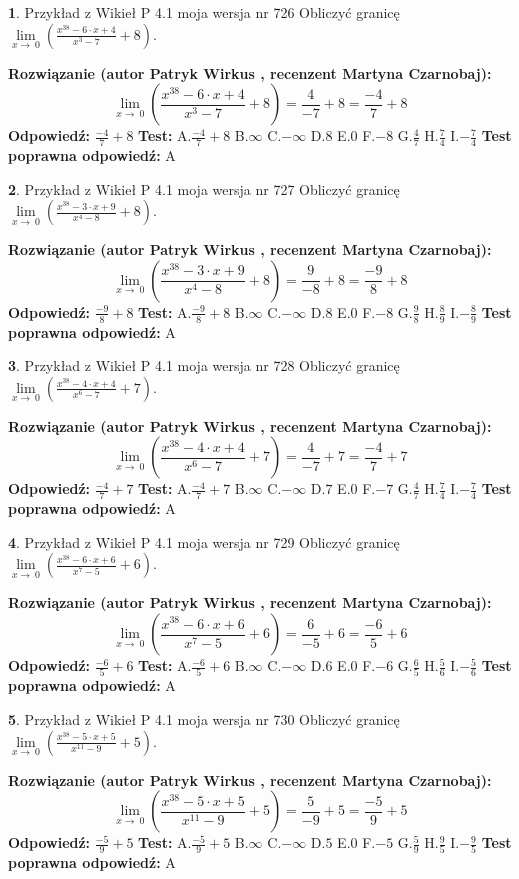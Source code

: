 \documentclass[12pt, a4paper]{article}
\theoremstyle{definition} %
\newtheorem{zad}{}
\newcommand{\zadStart}[1]{\begin{zad}#1\newline}
\newcommand{\zadStop}{\end{zad}}
\newcommand{\rozwStart}[2]{\noindent \textbf{Rozwiązanie (autor #1 , recenzent #2): }\newline}
\newcommand{\rozwStop}{\newline}
\newcommand{\odpStart}{\noindent \textbf{Odpowiedź:}\newline}
\newcommand{\odpStop}{\newline}
\newcommand{\testStart}{\noindent \textbf{Test:}\newline}
\newcommand{\testStop}{\newline}
\newcommand{\kluczStart}{\noindent \textbf{Test poprawna odpowiedź:}\newline}
\newcommand{\kluczStop}{\newline}
\begin{document}
\zadStart{Przykład z Wikieł P 4.1 moja wersja nr 726}
Obliczyć granicę $\lim\limits_{x\to\ 0}(\frac{x^{38}-6 \cdot x +4}{x^{3}-7}+8)$.
\zadStop
\rozwStart{Patryk Wirkus}{Martyna Czarnobaj}
$$\lim\limits_{x\to\ 0}(\frac{x^{38}-6 \cdot x +4}{x^{3}-7}+8)=\frac{4}{-7}+8=\frac{-4}{7}+8$$
\rozwStop
\odpStart
$\frac{-4}{7}+8$
\odpStop
\testStart
A.$\frac{-4}{7}+8$
B.$\infty$
C.$-\infty$
D.$8$
E.$0$
F.$-8$
G.$\frac{4}{7}$
H.$\frac{7}{4}$
I.$-\frac{7}{4}$
\testStop
\kluczStart
A
\kluczStop



\zadStart{Przykład z Wikieł P 4.1 moja wersja nr 727}
Obliczyć granicę $\lim\limits_{x\to\ 0}(\frac{x^{38}-3 \cdot x +9}{x^{4}-8}+8)$.
\zadStop
\rozwStart{Patryk Wirkus}{Martyna Czarnobaj}
$$\lim\limits_{x\to\ 0}(\frac{x^{38}-3 \cdot x +9}{x^{4}-8}+8)=\frac{9}{-8}+8=\frac{-9}{8}+8$$
\rozwStop
\odpStart
$\frac{-9}{8}+8$
\odpStop
\testStart
A.$\frac{-9}{8}+8$
B.$\infty$
C.$-\infty$
D.$8$
E.$0$
F.$-8$
G.$\frac{9}{8}$
H.$\frac{8}{9}$
I.$-\frac{8}{9}$
\testStop
\kluczStart
A
\kluczStop



\zadStart{Przykład z Wikieł P 4.1 moja wersja nr 728}
Obliczyć granicę $\lim\limits_{x\to\ 0}(\frac{x^{38}-4 \cdot x +4}{x^{6}-7}+7)$.
\zadStop
\rozwStart{Patryk Wirkus}{Martyna Czarnobaj}
$$\lim\limits_{x\to\ 0}(\frac{x^{38}-4 \cdot x +4}{x^{6}-7}+7)=\frac{4}{-7}+7=\frac{-4}{7}+7$$
\rozwStop
\odpStart
$\frac{-4}{7}+7$
\odpStop
\testStart
A.$\frac{-4}{7}+7$
B.$\infty$
C.$-\infty$
D.$7$
E.$0$
F.$-7$
G.$\frac{4}{7}$
H.$\frac{7}{4}$
I.$-\frac{7}{4}$
\testStop
\kluczStart
A
\kluczStop



\zadStart{Przykład z Wikieł P 4.1 moja wersja nr 729}
Obliczyć granicę $\lim\limits_{x\to\ 0}(\frac{x^{38}-6 \cdot x +6}{x^{7}-5}+6)$.
\zadStop
\rozwStart{Patryk Wirkus}{Martyna Czarnobaj}
$$\lim\limits_{x\to\ 0}(\frac{x^{38}-6 \cdot x +6}{x^{7}-5}+6)=\frac{6}{-5}+6=\frac{-6}{5}+6$$
\rozwStop
\odpStart
$\frac{-6}{5}+6$
\odpStop
\testStart
A.$\frac{-6}{5}+6$
B.$\infty$
C.$-\infty$
D.$6$
E.$0$
F.$-6$
G.$\frac{6}{5}$
H.$\frac{5}{6}$
I.$-\frac{5}{6}$
\testStop
\kluczStart
A
\kluczStop



\zadStart{Przykład z Wikieł P 4.1 moja wersja nr 730}
Obliczyć granicę $\lim\limits_{x\to\ 0}(\frac{x^{38}-5 \cdot x +5}{x^{11}-9}+5)$.
\zadStop
\rozwStart{Patryk Wirkus}{Martyna Czarnobaj}
$$\lim\limits_{x\to\ 0}(\frac{x^{38}-5 \cdot x +5}{x^{11}-9}+5)=\frac{5}{-9}+5=\frac{-5}{9}+5$$
\rozwStop
\odpStart
$\frac{-5}{9}+5$
\odpStop
\testStart
A.$\frac{-5}{9}+5$
B.$\infty$
C.$-\infty$
D.$5$
E.$0$
F.$-5$
G.$\frac{5}{9}$
H.$\frac{9}{5}$
I.$-\frac{9}{5}$
\testStop
\kluczStart
A
\kluczStop
\end{document}
